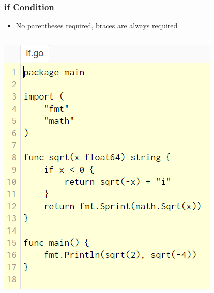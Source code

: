 \documentclass[14pt]{beamer}
\begin{document}
{
\begin{frame}
    \frametitle{if Condition}
    \begin{itemize}
        \item No parentheses required, braces are always required
    \end{itemize}
    \begin{columns}
        \begin{column}{0.5\textwidth}
        \includegraphics[width=\linewidth]{img/if.PNG}
        \end{column}
        \begin{column}{0.5\textwidth}

\end{column}
\end{columns}
\end{frame}}
\end{document}
